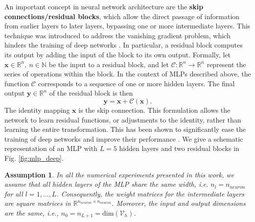 \documentclass{article}
\newcommand{\R}{\mathbb{R}}
\newcommand{\N}{\mathbb{N}}
\theoremstyle{plain}
\newtheorem{ass}{Assumption}
\numberwithin{equation}{section}
\begin{document}
An important concept in neural network architecture are the \textbf{skip connections/residual blocks}, which allow the direct passage of information from earlier layers to later layers, bypassing one or more intermediate layers. This technique was introduced to address the vanishing gradient problem, which hinders the training of deep networks \cite{he2016deep}. In particular, a residual block computes its output by adding the input of the block to its own output. Formally, let \( \mathbf{x} \in \R^{n}, \ n \in \N \) be the input to a residual block, and let \( \mathcal{C}:\R^n \to \R^{n} \) represent the series of operations within the block. In the context of MLPs described above, the function $\mathcal{C}$ corresponds to a sequence of one or more hidden layers. The final output \( \mathbf{y} \in \R^{n} \) of the residual block is then
\begin{equation}
    \mathbf{y} = \mathbf{x} + \mathcal{C}(\mathbf{x}).
    \label{eq:skip_connection}
\end{equation}
The identity mapping \( \mathbf{x} \) is the skip connection. This formulation allows the network to learn residual functions, or adjustments to the identity, rather than learning the entire transformation. This has been shown to significantly ease the training of deep networks and improve their performance \cite{he2016identity}. We give a schematic representation of an MLP with $L=5$ hidden layers and two residual blocks in Fig. \ref{fig:mlp_deep}.
\begin{ass}
    In all the numerical experiments presented in this work, we assume that all hidden layers of the MLP share the same width, i.e. $n_l = n_{neuron}$ for all $l = 1, \dots, L$. Consequently, the weight matrices for the intermediate layers are square matrices in $\R^{n_{neuron} \times n_{neuron}}$. Moreover, the input and output dimensions are the same, i.e., $n_0=n_{L+1}=\text{dim}(\mathcal{V}_h)$.
\end{ass}
\end{document}

